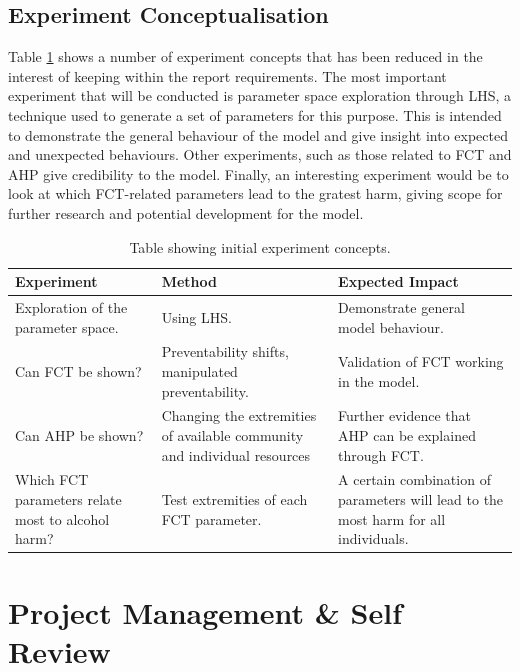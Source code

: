 \subsection{Experiment Conceptualisation}

Table \ref{tab:experiments} shows a number of experiment concepts that has been reduced in the interest of keeping within the report requirements. The most important experiment that will be conducted is parameter space exploration through \ac{LHS}, a technique used to generate a set of parameters for this purpose. This is intended to demonstrate the general behaviour of the model and give insight into expected and unexpected behaviours. Other experiments, such as those related to \ac{FCT} and \ac{AHP} give credibility to the model. Finally, an interesting experiment would be to look at which \ac{FCT}-related parameters lead to the gratest harm, giving scope for further research and potential development for the model.  

\begin{table}[H]
\centering
\begin{tabular}{||p{}|p{}|p{}||}
 \hline
    Experiment & Method & Expected Impact \\[0.5ex] 
 \hline\hline
  Exploration of the parameter space. & Using \ac{LHS}. & Demonstrate general model behaviour. \\ 
  \hline
  Can \ac{FCT} be shown?  & Preventability shifts,  manipulated preventability. & Validation of \ac{FCT} working in the model. \\
  
  \hline
  Can \ac{AHP} be shown? & Changing the extremities of available community and individual resources & Further evidence that \ac{AHP} can be explained through \ac{FCT}. \\
  \hline
  
  Which \ac{FCT} parameters relate most to alcohol harm? & Test extremities of each \ac{FCT} parameter. & A certain combination of parameters will lead to the most harm for all individuals. \\ [1ex] 
 \hline
\end{tabular}
\caption{Table showing initial experiment concepts.}
\label{tab:experiments}
\end{table}

\section{Project Management \& Self Review}

